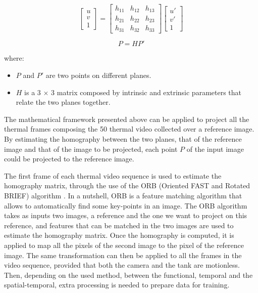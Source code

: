 \begin{equation*}
    \begin{bmatrix} u\\ v\\ 1 \end{bmatrix} = 
        \begin{bmatrix}
        h_{11}& h_{12} & h_{13} \\ 
        h_{21}& h_{22} & h_{23} \\
        h_{31}& h_{32} & h_{33}
        \end{bmatrix}
        \begin{bmatrix} u'\\ v'\\ 1 \end{bmatrix}
\end{equation*}

\begin{equation} \label{projection}
P=HP'
\end{equation}

where:

\begin{itemize}
    \item $P$ and $P'$ are two points on different planes.
    \item $H$ is a 3 $\times$ 3 matrix composed by intrinsic and extrinsic parameters that relate the two planes together.
\end{itemize}


The mathematical framework presented above can be applied to project all the thermal frames composing the 50 thermal video collected over a reference image. By estimating the homography between the two planes, that of the reference image and that of the image to be projected, each point $P$ of the input image could be projected to the reference image. 

The first frame of each thermal video sequence is used to estimate the homography matrix, through the use of the ORB (Oriented FAST and Rotated BRIEF) algorithm \citep{rublee2011orb}. In a nutshell, ORB is a feature matching algorithm that allows to automatically find some key-points in an image. The ORB algorithm takes as inputs two images, a reference and the one we want to project on this reference, and features that can be matched in the two images are used to estimate the homography matrix. Once the homography is computed, it is applied to map all the pixels of the second image to the pixel of the reference image. The same transformation can then be applied to all the frames in the video sequence, provided that both the camera and the tank are motionless. 
%
Then, depending on the used method, between the functional, temporal and the spatial-temporal, extra processing is needed to prepare data for training.

